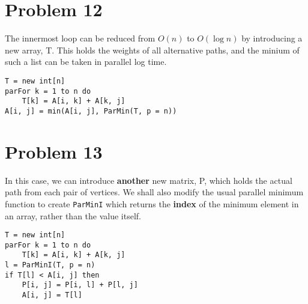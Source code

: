 \documentclass{article}
\providecommand{\prob}[1]{\section*{Problem #1}}
\begin{document}
    \pagebreak
    \prob{12}
        The innermost loop can be reduced from $O(n)$ to $O(\log n)$ by introducing a new array, T.
        This holds the weights of all alternative paths, and the minium of such a list can be taken in parallel log time.
        \begin{lstlisting}
T = new int[n]
parFor k = 1 to n do
    T[k] = A[i, k] + A[k, j]
A[i, j] = min(A[i, j], ParMin(T, p = n))
        \end{lstlisting}
    
    \prob{13}
        In this case, we can introduce \textbf{another} new matrix, P, which holds the actual path from each pair of vertices.
        We shall also modify the usual parallel minimum function to create \texttt{ParMinI} which returns the \textbf{index} of the minimum element in an array, rather than the value itself.
        \begin{lstlisting}
T = new int[n]
parFor k = 1 to n do
    T[k] = A[i, k] + A[k, j]
l = ParMinI(T, p = n)
if T[l] < A[i, j] then
    P[i, j] = P[i, l] + P[l, j]
    A[i, j] = T[l]
        \end{lstlisting}
\end{document}
